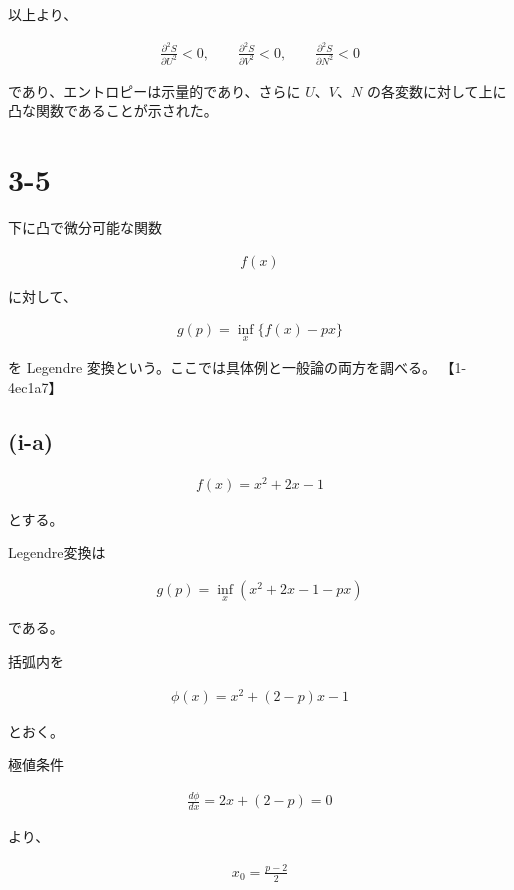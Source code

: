 \documentclass[platex,dvipdfmx,a4paper]{jsarticle}
\begin{document}
以上より、

\begin{align*}
\frac{\partial^2S}{\partial U^2}<0,
\qquad
\frac{\partial^2S}{\partial V^2}<0,
\qquad
\frac{\partial^2S}{\partial N^2}<0
\end{align*}

であり、エントロピーは示量的であり、さらに $U$、$V$、$N$ の各変数に対して上に凸な関数であることが示された。
\section{3-5}

下に凸で微分可能な関数

\begin{align*}
f(x)
\end{align*}

に対して、

\begin{align*}
g(p)
=
\inf_x\{f(x)-px\}
\end{align*}

を Legendre 変換という。ここでは具体例と一般論の両方を調べる。 【1-4ec1a7】

\subsection{(i-a)}

\begin{align*}
f(x)=x^2+2x-1
\end{align*}

とする。

Legendre変換は

\begin{align*}
g(p)
=
\inf_x
\left(
x^2+2x-1-px
\right)
\end{align*}

である。

括弧内を

\begin{align*}
\phi(x)
=
x^2+(2-p)x-1
\end{align*}

とおく。

極値条件

\begin{align*}
\frac{d\phi}{dx}
=
2x+(2-p)
=
0
\end{align*}

より、

\begin{align*}
x_0
=
\frac{p-2}{2}
\end{align*}
\end{document}
